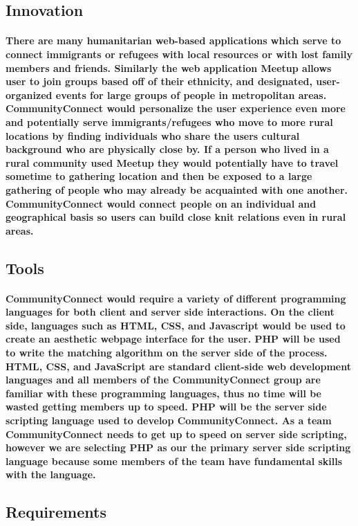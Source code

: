 \documentclass[12pt]{article}
\begin{document}
	\subsection{\bf Innovation}
		\paragraph{\normalfont \indent There are many humanitarian web-based applications which serve to connect immigrants or refugees with local resources or with lost family members and friends. Similarly the web application Meetup allows user to join groups based off of their ethnicity, and designated, user-organized events for large groups of people in metropolitan areas. CommunityConnect would personalize the user experience even more and potentially serve immigrants/refugees who move to more rural locations by finding individuals who share the users cultural background who are physically close by. If a person who lived in a rural community used Meetup they would potentially have to travel sometime to gathering location and then be exposed to a large gathering of people who may already be acquainted with one another. CommunityConnect would connect people on an individual and geographical basis so users can build close knit relations even in rural areas.
		}
	\subsection{\bf Tools}
		\paragraph{\normalfont \indent CommunityConnect would require a variety of different programming languages for both client and server side interactions. On the client side, languages such as HTML, CSS, and Javascript would be used to create an aesthetic webpage interface for the user. PHP will be used to write the matching algorithm on the server side of the process. HTML, CSS, and JavaScript are standard client-side web development languages and all members of the CommunityConnect group are familiar with these programming languages, thus no time will be wasted getting members up to speed. PHP will be the server side scripting language used to develop CommunityConnect. As a team CommunityConnect needs to get up to speed on server side scripting, however we are selecting PHP as our the primary server side scripting language because some members of the team have fundamental skills with the language.
		}
	\subsection{\bf Requirements}
\end{document}
